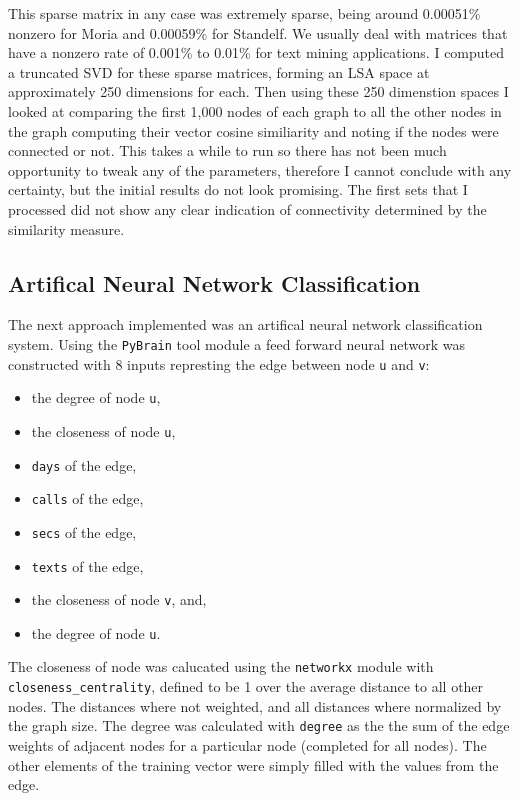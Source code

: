 This sparse matrix in any case was extremely sparse, being around 0.00051\%
nonzero for Moria and 0.00059\% for Standelf.  We usually deal with matrices
that have a nonzero rate of 0.001\% to 0.01\% for text mining applications.  I
computed a truncated SVD for these sparse matrices, forming an LSA space at
approximately 250 dimensions for each.  Then using these 250 dimenstion spaces
I looked at comparing the first 1,000 nodes of each graph to all the other
nodes in the graph computing their vector cosine similiarity and noting if the
nodes were connected or not.  This takes a while to run so there has not been
much opportunity to tweak any of the parameters, therefore I cannot conclude
with any certainty, but the initial results do not look promising.  The first
sets that I  processed did not show any clear indication of connectivity
determined by the similarity measure.

\subsection{Artifical Neural Network Classification}
The next approach implemented was an artifical neural network classification system.
Using the \verb+PyBrain+ tool module a feed forward neural network was constructed with 8 inputs represting the edge between node \texttt{u} and \texttt{v}:
\begin{itemize}
	\item the degree of node \texttt{u},
	\item the closeness of node \texttt{u},
	\item \texttt{days} of the edge,
	\item \texttt{calls} of the edge,
	\item \texttt{secs} of the edge,
	\item \texttt{texts} of the edge,
	\item the closeness of node \texttt{v}, and,
	\item the degree of node \texttt{u}.
\end{itemize}
The closeness of node was calucated using the \verb+networkx+ module with \verb+closeness_centrality+, defined to be 1 over the average distance to all other nodes. The distances where not weighted, and all distances where normalized by the graph size.
The degree was calculated with \verb+degree+ as the the sum of the edge weights of adjacent nodes for a particular node (completed for all nodes).
The other elements of the training vector were simply filled with the values from the edge.

